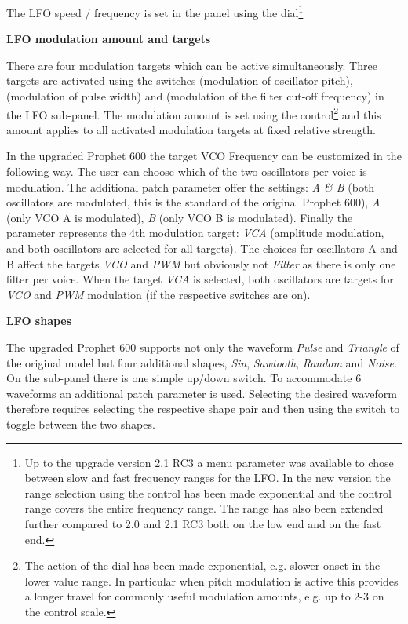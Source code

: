 The LFO speed / frequency is set in the panel using the \lfofreq dial\footnote{Up to the upgrade version 2.1 RC3 a menu parameter was available to chose between slow and fast frequency ranges for the LFO. In the new version the range selection using the \lfofreq control has been made exponential and the control range covers the entire frequency range. The range has also been extended further compared to 2.0 and 2.1 RC3 both on the low end and on the fast end.} 

\textbf{LFO modulation amount and targets}

There are four modulation targets which can be active simultaneously. Three targets are activated using the switches \lfovco (modulation of oscillator pitch), \lfopwm (modulation of pulse width) and \lfofil (modulation of the filter cut-off frequency) in the LFO sub-panel. The modulation amount is set using the \lfoamt control\footnote{The action of the \lfoamt dial has been made exponential, e.g. slower onset in the lower value range. In particular when pitch modulation is active this provides a longer travel for commonly useful modulation amounts, e.g. up to 2-3 on the control scale.} and this amount applies to all activated modulation targets at fixed relative strength. 

In the upgraded Prophet 600 the target VCO Frequency can be customized in the following way. The user can choose which of the two oscillators per voice is modulation. The additional patch parameter \lfotarget
offer the settings: \textit{A \& B} (both oscillators are modulated, this is the standard of the original Prophet 600), \textit{A} (only VCO A is modulated), \textit{B} (only VCO B is modulated). Finally the parameter represents the 4th modulation target: \textit{VCA} (amplitude modulation, and both oscillators are selected for all targets). The choices for oscillators A and B affect the targets \textit{VCO} and \textit{PWM} but obviously not \textit{Filter}  as there is only one filter per voice. When the target \textit{VCA} is selected, both oscillators are targets for \textit{VCO} and \textit{PWM} modulation (if the respective switches are on). 

\textbf{LFO shapes}

The upgraded Prophet 600 supports not only the waveform \textit{Pulse} and \textit{Triangle} of the original model but four additional shapes, \textit{Sin}, \textit{Sawtooth}, \textit{Random} and \textit{Noise}. On the sub-panel there is one simple up/down \shapeswitch switch. To accommodate 6 waveforms an additional patch parameter \lfoshape is used. Selecting the desired waveform therefore requires selecting the respective shape pair and then using the \shapeswitch switch to toggle between the two shapes. 

